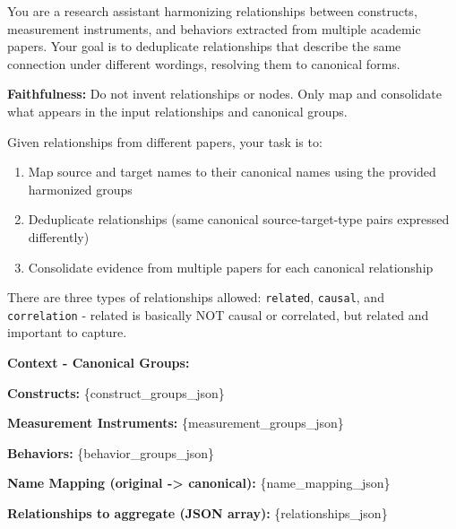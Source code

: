 \begin{tcolorbox}[breakable,enhanced,colback=blue!3,colframe=blue!40!black,title={Prompt},fonttitle=\bfseries,left=8pt,right=8pt,top=6pt,bottom=6pt]

You are a research assistant harmonizing relationships between constructs, measurement instruments, and behaviors extracted from multiple academic papers. Your goal is to deduplicate relationships that describe the same connection under different wordings, resolving them to canonical forms.

\textbf{Faithfulness:} Do not invent relationships or nodes. Only map and consolidate what appears in the input relationships and canonical groups.

Given relationships from different papers, your task is to:
\begin{enumerate}
\item Map source and target names to their canonical names using the provided harmonized groups
\item Deduplicate relationships (same canonical source-target-type pairs expressed differently)
\item Consolidate evidence from multiple papers for each canonical relationship
\end{enumerate}

There are three types of relationships allowed: \texttt{related}, \texttt{causal}, and \texttt{correlation} - related is basically NOT causal or correlated, but related and important to capture.

\textbf{Context - Canonical Groups:}

\textbf{Constructs:}
\{construct\_groups\_json\}

\textbf{Measurement Instruments:}
\{measurement\_groups\_json\}

\textbf{Behaviors:}
\{behavior\_groups\_json\}

\textbf{Name Mapping (original -> canonical):}
\{name\_mapping\_json\}

\textbf{Relationships to aggregate (JSON array):}
\{relationships\_json\}


\end{tcolorbox}
